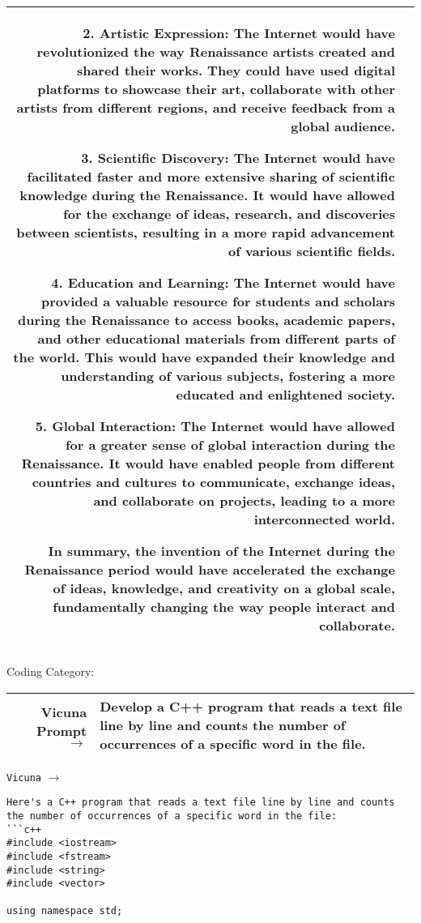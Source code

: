 \documentclass{article}
\begin{document}
{{\begin{tabularx}{\linewidth}{r X}
2. Artistic Expression: The Internet would have revolutionized the way Renaissance artists created and shared their works. They could have used digital platforms to showcase their art, collaborate with other artists from different regions, and receive feedback from a global audience.

3. Scientific Discovery: The Internet would have facilitated faster and more extensive sharing of scientific knowledge during the Renaissance. It would have allowed for the exchange of ideas, research, and discoveries between scientists, resulting in a more rapid advancement of various scientific fields.

4. Education and Learning: The Internet would have provided a valuable resource for students and scholars during the Renaissance to access books, academic papers, and other educational materials from different parts of the world. This would have expanded their knowledge and understanding of various subjects, fostering a more educated and enlightened society.

5. Global Interaction: The Internet would have allowed for a greater sense of global interaction during the Renaissance. It would have enabled people from different countries and cultures to communicate, exchange ideas, and collaborate on projects, leading to a more interconnected world.

In summary, the invention of the Internet during the Renaissance period would have accelerated the exchange of ideas, knowledge, and creativity on a global scale, fundamentally changing the way people interact and collaborate.
 \\
 \bottomrule
 \end{tabularx} }

\newpage
Coding Category:

{  \footnotesize \begin{tabularx}{\linewidth}{r X} \toprule Vicuna Prompt $\to$ & {\bf Develop a C++ program that reads a text file line by line and counts the number of occurrences of a specific word in the file.}
\\
 \bottomrule
 \end{tabularx} }
\texttt{Vicuna} $\to$
\begin{lstlisting}[upquote=true]
Here's a C++ program that reads a text file line by line and counts the number of occurrences of a specific word in the file:
```c++
#include <iostream>
#include <fstream>
#include <string>
#include <vector>

using namespace std;


\end{lstlisting}}
\end{document}
